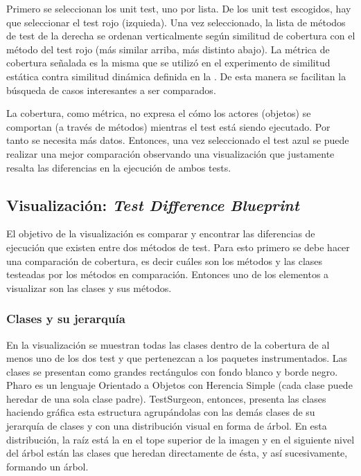 
\par Primero se seleccionan los unit test, uno por lista. De los unit test escogidos, hay que seleccionar el test rojo (izquieda). Una vez seleccionado, la lista de métodos de test de la derecha se ordenan verticalmente según similitud de cobertura con el método del test rojo (más similar arriba, más distinto abajo). La métrica de cobertura señalada es la misma que se utilizó en el experimento de similitud estática contra similitud dinámica definida en la . De esta manera se facilitan la búsqueda de casos interesantes a ser comparados. 

\par La cobertura, como métrica, no expresa el cómo los actores (objetos) se comportan (a través de métodos) mientras el test está siendo ejecutado. Por tanto se necesita más datos. Entonces, una vez seleccionado el test azul se puede realizar una mejor comparación observando una visualización que justamente resalta las diferencias en la ejecución de ambos tests.

\subsection{Visualización: \emph{Test Difference Blueprint}}

\par El objetivo de la visualización es comparar y encontrar las diferencias de ejecución que existen entre dos métodos de test. Para esto primero se debe hacer una comparación de cobertura, es decir cuáles son los métodos y las clases testeadas por los métodos en comparación. Entonces uno de los elementos a visualizar son las clases y sus métodos. 

\subsubsection{Clases y su jerarquía}

\par En la visualización se muestran todas las clases dentro de la cobertura de al menos uno de los dos test y que pertenezcan a los paquetes instrumentados. Las clases se presentan como grandes rectángulos con fondo blanco y borde negro. Pharo es un lenguaje Orientado a Objetos con Herencia Simple (cada clase puede heredar de una sola clase padre). TestSurgeon, entonces, presenta las clases haciendo gráfica esta estructura agrupándolas con las demás clases de su jerarquía de clases y con una distribución visual en forma de árbol. En esta distribución, la raíz está la en el tope superior de la imagen y en el siguiente nivel del árbol están las clases que heredan directamente de ésta, y así sucesivamente, formando un árbol.

